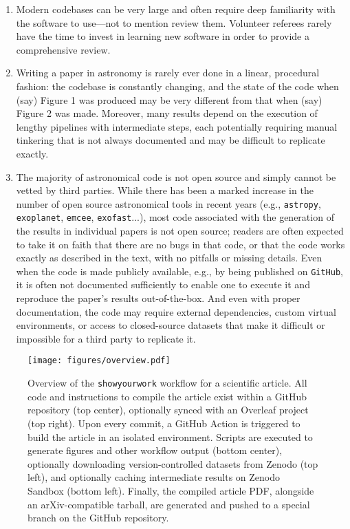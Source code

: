 \documentclass[modern]{aastex631}
\newcommand\syw{\texttt{showyourwork}\xspace}
\begin{document}
\begin{enumerate}
    \item Modern codebases can be very large and often require deep familiarity with the software to use---not to mention review them. Volunteer referees rarely have the time to invest in learning new software in order to provide a comprehensive review.
    \item  Writing a paper in astronomy is rarely ever done in a linear, procedural fashion: the codebase is constantly changing, and the state of the code when (say) Figure 1 was produced may be very different from that when (say) Figure 2 was made. 
    Moreover, many results depend on the execution of lengthy pipelines with intermediate steps, each potentially requiring manual tinkering that is not always documented and may be difficult to replicate exactly.
    \item The majority of astronomical code is not open source and simply cannot be vetted by third parties. 
    While there has been a marked increase in the number of open source astronomical tools in recent years (e.g., \texttt{astropy}, \texttt{exoplanet}, \texttt{emcee}, \texttt{exofast}...), most code associated with the generation of the results in individual papers is not open source; readers are often expected to take it on faith that there are no bugs in that code, or that the code works exactly as described in the text, with no pitfalls or missing details. 
    Even when the code is made publicly available, e.g., by being published on \texttt{GitHub}, it is often not documented sufficiently to enable one to execute it and reproduce the paper's results out-of-the-box. 
    And even with proper documentation, the code may require external dependencies, custom virtual environments, or access to closed-source datasets that make it difficult or impossible for a third party to replicate it.
\end{enumerate}

\begin{figure}[t!]
    \begin{centering}
        \texttt{[image: figures/overview.pdf]}
        \caption{
            Overview of the \syw workflow for a scientific article.
            All code and instructions to compile the article exist within a GitHub repository (top center), optionally synced with an Overleaf project (top right).
            Upon every commit, a GitHub Action is triggered to build the article in an isolated environment.
            Scripts are executed to generate figures and other workflow output (bottom center), optionally downloading version-controlled datasets from Zenodo (top left), and optionally caching intermediate results on Zenodo Sandbox (bottom left).
            Finally, the compiled article PDF, alongside an arXiv-compatible tarball, are generated and pushed to a special branch on the GitHub repository.
        }
        \label{fig:overview}
    \end{centering}
\end{figure}
\end{document}
